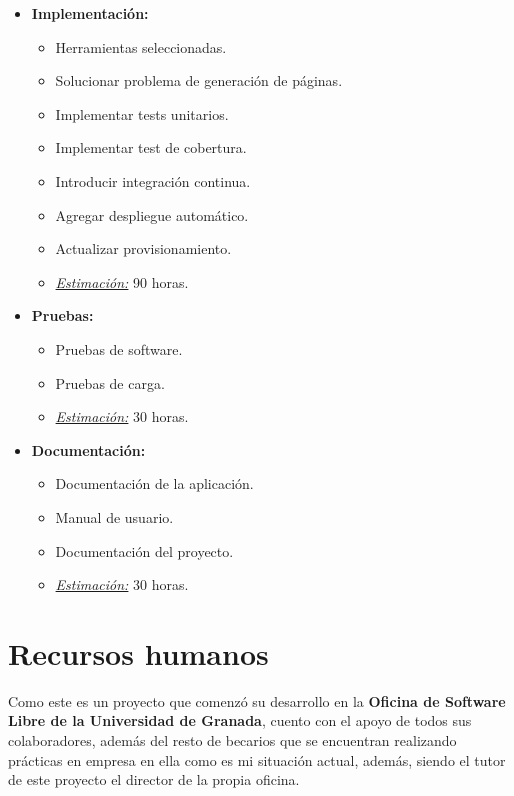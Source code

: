 \begin{itemize}
 \item \textbf{Implementación:}
 \begin{itemize}
  \item Herramientas seleccionadas.
  \item Solucionar problema de generación de páginas.
  \item Implementar tests unitarios.
  \item Implementar test de cobertura.
  \item Introducir integración continua.
  \item Agregar despliegue automático.
  \item Actualizar provisionamiento.
  \item \underline{\textit{Estimación:}} 90 horas.
 \end{itemize}
\end{itemize}

\newpage
\begin{itemize}
 \item \textbf{Pruebas:}
 \begin{itemize}
  \item Pruebas de software.
  \item Pruebas de carga.
  \item \underline{\textit{Estimación:}} 30 horas.
 \end{itemize}
\end{itemize}

\begin{itemize}
 \item \textbf{Documentación:}
 \begin{itemize}
  \item Documentación de la aplicación.
  \item Manual de usuario.
  \item Documentación del proyecto.
  \item \underline{\textit{Estimación:}} 30 horas.
 \end{itemize}
\end{itemize}

\section{Recursos humanos}

Como este es un proyecto que comenzó su desarrollo en la \textbf{Oficina de Software Libre de la Universidad de Granada}, cuento con el apoyo de todos sus colaboradores, además del resto de becarios que se encuentran realizando prácticas en empresa en ella como es mi situación actual, además, siendo el tutor de este proyecto el director de la propia oficina.

